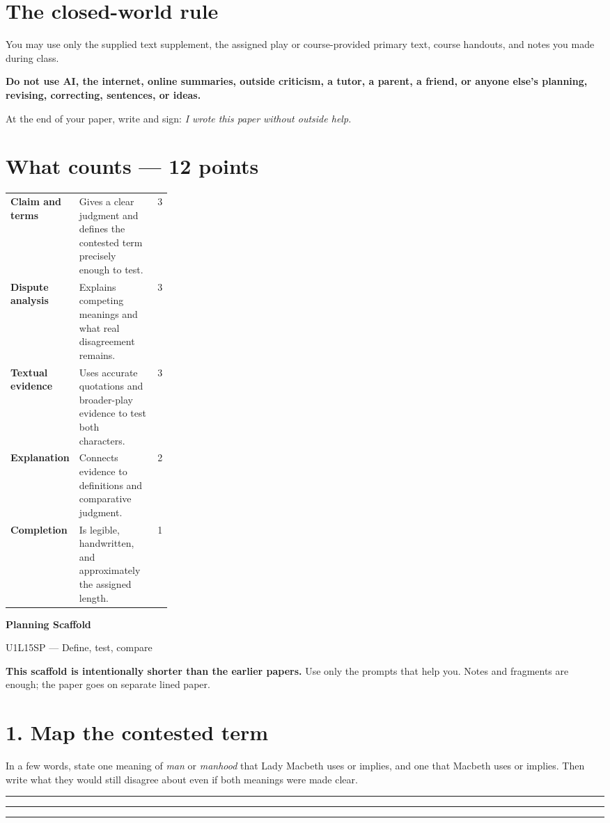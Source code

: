 \documentclass[11pt]{article}
\newcommand{\blankline}{\par\vspace{0.1em}\noindent\rule{\linewidth}{0.4pt}\par\vspace{0.34em}}
\begin{document}
\section*{The closed-world rule}
You may use only the supplied text supplement, the assigned play or course-provided primary text, course handouts, and notes you made during class.

\textbf{Do not use AI, the internet, online summaries, outside criticism, a tutor, a parent, a friend, or anyone else's planning, revising, correcting, sentences, or ideas.}

At the end of your paper, write and sign: \emph{I wrote this paper without outside help.}

\section*{What counts --- 12 points}
\begin{tabularx}{\linewidth}{>{\bfseries}p{0.27\linewidth}Xr}
Claim and terms & Gives a clear judgment and defines the contested term precisely enough to test. & 3\\
Dispute analysis & Explains competing meanings and what real disagreement remains. & 3\\
Textual evidence & Uses accurate quotations and broader-play evidence to test both characters. & 3\\
Explanation & Connects evidence to definitions and comparative judgment. & 2\\
Completion & Is legible, handwritten, and approximately the assigned length. & 1\\
\end{tabularx}
\endgroup

\newpage
\begin{center}
{\Large\bfseries Planning Scaffold}\par
{\large U1L15SP --- Define, test, compare}
\end{center}
\textbf{This scaffold is intentionally shorter than the earlier papers.} Use only the prompts that help you. Notes and fragments are enough; the paper goes on separate lined paper.

\section*{1. Map the contested term}
In a few words, state one meaning of \emph{man} or \emph{manhood} that Lady Macbeth uses or implies, and one that Macbeth uses or implies. Then write what they would still disagree about even if both meanings were made clear.
\blankline
\blankline
\blankline
\end{document}
